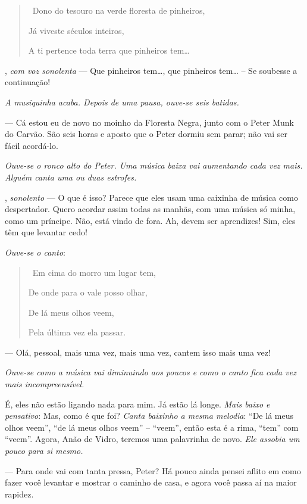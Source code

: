 \begin{myparindent}{0pt}
\begin{Parskip}
\begin{quote}
\quad \, Dono do tesouro na verde floresta de pinheiros,

Já viveste séculos inteiros,

A ti pertence toda terra que pinheiros tem\ldots{}
\end{quote}

, \emph{com voz sonolenta} --- Que pinheiros
tem\ldots{}, que pinheiros tem\ldots{} -- Se soubesse a continuação!

\emph{A musiquinha acaba. Depois de uma pausa, ouve-se seis batidas.}

 --- Cá estou eu de novo no moinho da Floresta Negra, junto com o
Peter Munk do Carvão. São seis horas e aposto que o Peter dormiu sem
parar; não vai ser fácil acordá-lo.

\emph{Ouve-se o ronco alto do Peter. Uma música baixa vai aumentando
cada vez mais. Alguém canta uma ou duas estrofes.}

, \emph{sonolento} --- O que é isso? Parece que eles
usam uma caixinha de música como despertador. Quero acordar assim todas
as manhãs, com uma música só minha, como um príncipe. Não, está vindo de
fora. Ah, devem ser aprendizes! Sim, eles têm que levantar cedo!

\emph{Ouve-se o canto}:

\begin{quote}
\quad \, Em cima do morro um lugar tem,

De onde para o vale posso olhar,

De lá meus olhos veem,

Pela última vez ela passar.
\end{quote}

 --- Olá, pessoal, mais uma vez, mais uma vez, cantem
isso mais uma vez!

\emph{Ouve-se como a música vai diminuindo aos poucos e como o canto
fica cada vez mais incompreensível.}

É, eles não estão ligando nada para mim. Já estão lá longe. \emph{Mais
baixo e pensativo}: Mas, como é que foi? \emph{Canta baixinho a mesma
melodia}: ``De lá meus olhos veem'', ``de lá meus olhos veem'' --
``veem'', então esta é a rima, ``tem'' com ``veem''. Agora, Anão de
Vidro, teremos uma palavrinha de novo. \emph{Ele assobia um pouco para
si mesmo.}

 --- Para onde vai com tanta pressa, Peter? Há pouco ainda pensei
aflito em como fazer você levantar e mostrar o caminho de casa, e agora
você passa aí na maior rapidez.


\end{Parskip}
\end{myparindent}
